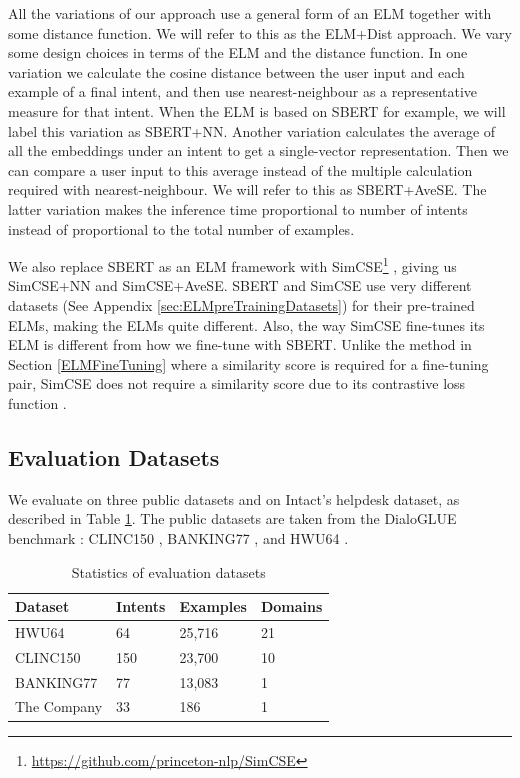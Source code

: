 \documentclass[sigconf, anonymous=true]{acmart}
\begin{document}
All the variations of our approach use a general form of an ELM together with some distance function. We will refer to this as the ELM+Dist approach. We vary some design choices in terms of the ELM and the distance function. In one variation we calculate the cosine distance between the user input and each example of a final intent, and then use nearest-neighbour as a representative measure for that intent. When the ELM is based on SBERT for example, we will label this variation as SBERT+NN. Another variation calculates the average of all the embeddings under an intent to get a single-vector representation. Then we can compare a user input to this average instead of the multiple calculation required with nearest-neighbour. We will refer to this as SBERT+AveSE. The latter variation makes the inference time proportional to number of intents instead of proportional to the total number of examples.  

We also replace SBERT as an ELM framework with SimCSE\footnote{\url{https://github.com/princeton-nlp/SimCSE}} \citep{gao2021simcse}, giving us SimCSE+NN and SimCSE+AveSE. SBERT and SimCSE use very different datasets (See Appendix \ref{sec:ELMpreTrainingDatasets}) for their pre-trained ELMs, making the ELMs quite different. Also, the way SimCSE fine-tunes its ELM is different from how we fine-tune with SBERT. Unlike %
the method in Section \ref{ELMFineTuning} where a similarity score is required for a fine-tuning pair, SimCSE does not require a similarity score due to its contrastive loss function \citep{gao2021simcse}. 

\subsection{\textbf{Evaluation Datasets}} 
We evaluate on three public datasets and on Intact's helpdesk dataset, as described in Table \ref{tab:freq}. The public datasets are taken from the DialoGLUE benchmark \cite{MehriDialoGLUE2020}: CLINC150 \citep{larson-etal-2019-evaluation}, BANKING77 \citep{casanueva-etal-2020-efficient}, and HWU64 \citep{liu2019benchmarking}.  

\begin{table}[h]
\setlength{} %
\footnotesize\centering
\begin{tabular}{llll}
\hline \textbf{Dataset} & \textbf{Intents} & \textbf{Examples} & \textbf{Domains} \\
\hline HWU64 & 64 & 25,716 & 21 \\
CLINC150 & 150 & 23,700& 10 \\
BANKING77 & 77 & 13,083 & 1 \\
The Company & 33 & 186 & 1 \\
\hline
\end{tabular}
\caption{Statistics of evaluation datasets}
\label{tab:freq}
\end{table}
 
\end{document}
